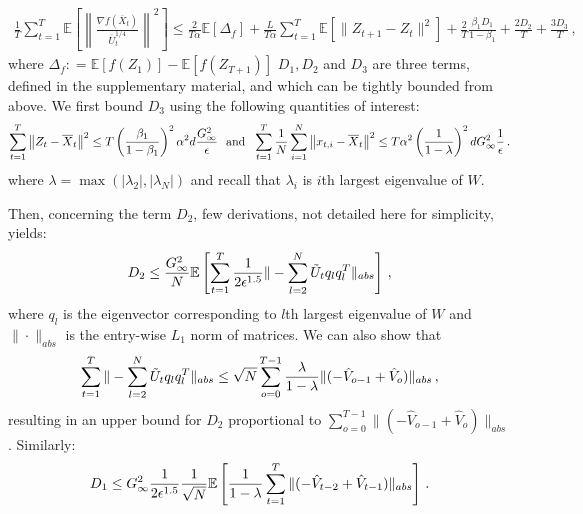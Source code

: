 \documentclass{article} %
\begin{document}
 {\small
 \begin{align} \label{eq: exp_telescope_sketch}
 \frac{1}{T}\sum_{t=1}^T  \mathbb E \left [\left\|\frac{\nabla f( \overline X_{t})}{\overline U_{t}^{1/4}}\right\|^2  \right] \leq \frac{2}{T\alpha}  \mathbb E  [\Delta_f] + \frac{L}{T\alpha} \sum_{t=1}^T\mathbb E\left[\| Z_{t+1}-  Z_{t}\|^2 \right]+ \frac{2}{T}\frac{\beta_1 D_1}{1-\beta_1}  + \frac{2 D_2}{T}  + \frac{3 D_3}{T} \, ,
 \end{align}
 }%
where $\Delta_f : = \mathbb E [f( Z_{1})] - \mathbb E [f( Z_{T+1})]$ $D_1, D_2$ and $D_3$ are three terms, defined in the supplementary material, and which can be tightly bounded from above. 
We first bound $D_3$ using the following quantities of interest:
 {\small
 \begin{align}\notag
 \sum_{t=1}^T\left\|  Z_{t} -  \overline X_{t}\right\|^2 \leq T \left( \frac{\beta_1}{1-\beta_1}\right)^2 \alpha^2 d \frac{G_{\infty}^2}{\epsilon} \text{\ \ and\ \ }
 \sum_{t=1}^T\frac{1}{N}\sum_{i=1}^N\left\| {  x_{t,i} -   \overline X_{t}}  \right\|^2 \leq T \alpha^2 \left (\frac{1}{1-\lambda} \right)^2 d G_{\infty}^2 \frac{1}{\epsilon} \,.
 \end{align}
 }%
 where $\lambda = \max (|\lambda_2|,|\lambda_N|)$ and recall that $\lambda_i$ is $i$th largest eigenvalue of $W$.
 
 
 Then, concerning the term $D_2$, few derivations, not detailed here for simplicity, yields:
 \begin{align}\notag
 D_2 \leq \frac{G_{\infty}^2}{N} \mathbb E \left[\sum_{t=1}^T \frac{1}{2\epsilon^{1.5}}  \| - \sum_{l=2}^N  \tilde U_t q_l q_l^T \|_{abs} \right] \, ,
 \end{align}
 where $q_l$ is the eigenvector corresponding to $l$th largest eigenvalue of $W$ and $\|\cdot\|_{abs}$ is the entry-wise $L_1$ norm of  matrices.
 We can also show that 
 \begin{align}\notag
 \sum_{t=1}^T  \| - \sum_{l=2}^N  \tilde U_t q_l q_l^T \|_{abs}  \leq {\sqrt{N}} \sum_{o=0}^{T-1} \frac{\lambda}{1-\lambda}     \|    (- \hat V_{o-1} + \hat V_{o} ) \|_{abs} \, ,
 \end{align}
 resulting in an upper bound for $D_2$ proportional to $\sum_{o=0}^{T-1}  \|    (- \hat V_{o-1} + \hat V_{o} ) \|_{abs} $. 
 Similarly:
 \begin{align}\notag
 D_1 \leq G_{\infty}^2 \frac{1}{2\epsilon^{1.5}} \frac{1}{\sqrt{N}}   \mathbb E \left [  \frac{1}{1-\lambda}   \sum_{t=1}^T  \| ( - \hat V_{t-2} + \hat V_{t-1}) \|_{abs}   \right]\, .
 \end{align}
\end{document}
